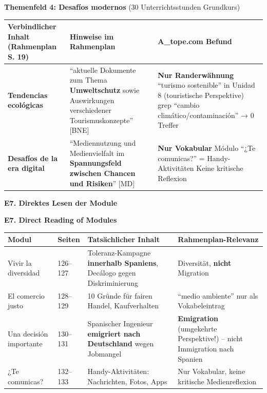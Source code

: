 \documentclass[10pt,a4paper]{article}
\newcommand{\secbil}[2]{%
\vspace{6pt}
\noindent\colorbox{spaet}{\parbox{0.48\textwidth}{\color{white}\bfseries\small #1}}%
\hfill%
\colorbox{english}{\parbox{0.48\textwidth}{\color{white}\bfseries\small #2}}
\vspace{3pt}
}
\begin{document}
\vspace{2mm}

\textbf{\textcolor{spanisch}{Themenfeld 4: Desafíos modernos}} (30 Unterrichtsstunden Grundkurs)

\vspace{1mm}

\begin{center}
\scriptsize
\begin{tabular}{|p{4cm}|p{5cm}|p{5cm}|}
\hline
\rowcolor{lightgray}
\textbf{Verbindlicher Inhalt (Rahmenplan S. 19)} & \textbf{Hinweise im Rahmenplan} & \textbf{A\_tope.com Befund} \\
\hline
\rowcolor{lightred}
\textbf{Tendencias ecológicas} & ``aktuelle Dokumente zum Thema \textbf{Umweltschutz} sowie Auswirkungen verschiedener Tourismuskonzepte'' [BNE] & \textcolor{spanisch}{\textbf{Nur Randerwähnung}} \newline ``turismo sostenible'' in Unidad 8 (touristische Perspektive) \newline grep ``cambio climático/contaminación'' → 0 Treffer \\
\hline
\rowcolor{lightred}
\textbf{Desafíos de la era digital} & ``Mediennutzung und Medienvielfalt im \textbf{Spannungsfeld zwischen Chancen und Risiken}'' [MD] & \textcolor{spanisch}{\textbf{Nur Vokabular}} \newline Módulo ``¿Te comunicas?'' = Handy-Aktivitäten \newline Keine kritische Reflexion \\
\hline
\end{tabular}
\end{center}

\vspace{3mm}

\secbil{E7. Direktes Lesen der Module}{E7. Direct Reading of Modules}

\vspace{2mm}

\begin{center}
\scriptsize
\begin{tabular}{|p{3.5cm}|p{2cm}|p{4cm}|p{4.5cm}|}
\hline
\rowcolor{lightgray}
\textbf{Modul} & \textbf{Seiten} & \textbf{Tatsächlicher Inhalt} & \textbf{Rahmenplan-Relevanz} \\
\hline
Vivir la diversidad & 126--127 & Toleranz-Kampagne \textbf{innerhalb Spaniens}, Decálogo gegen Diskriminierung & Diversität, \textbf{nicht} Migration \\
\hline
El comercio justo & 128--129 & 10 Gründe für fairen Handel, Kaufverhalten & ``medio ambiente'' nur als Vokabeleintrag \\
\hline
\rowcolor{lightspaet}
Una decisión importante & 130--131 & Spanischer Ingenieur \textbf{emigriert nach Deutschland} wegen Jobmangel & \textbf{Emigration} (umgekehrte Perspektive!) -- nicht Immigration nach Spanien \\
\hline
¿Te comunicas? & 132--133 & Handy-Aktivitäten: Nachrichten, Fotos, Apps & Nur Vokabular, keine kritische Medienreflexion \\
\hline
\end{tabular}
\end{center}
\end{document}

